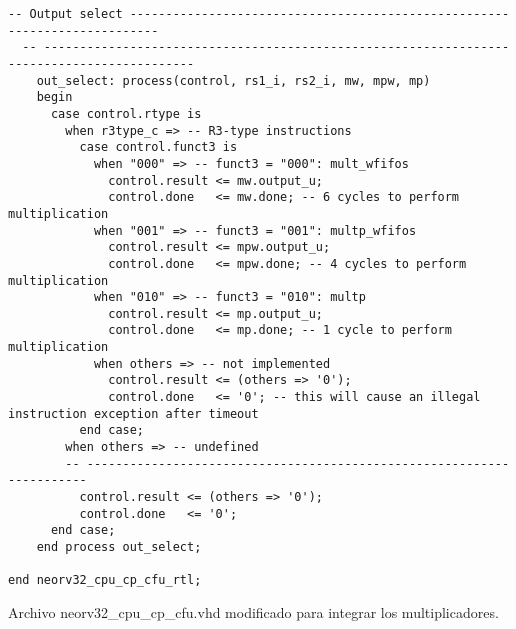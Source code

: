 \begin{code}
\begin{verbatim}
-- Output select --------------------------------------------------------------------------
  -- -------------------------------------------------------------------------------------------
    out_select: process(control, rs1_i, rs2_i, mw, mpw, mp)
    begin
      case control.rtype is
        when r3type_c => -- R3-type instructions
          case control.funct3 is
            when "000" => -- funct3 = "000": mult_wfifos
              control.result <= mw.output_u;
              control.done   <= mw.done; -- 6 cycles to perform multiplication
            when "001" => -- funct3 = "001": multp_wfifos
              control.result <= mpw.output_u;
              control.done   <= mpw.done; -- 4 cycles to perform multiplication
            when "010" => -- funct3 = "010": multp
              control.result <= mp.output_u;
              control.done   <= mp.done; -- 1 cycle to perform multiplication
            when others => -- not implemented
              control.result <= (others => '0');
              control.done   <= '0'; -- this will cause an illegal instruction exception after timeout
          end case;
        when others => -- undefined
        -- ----------------------------------------------------------------------
          control.result <= (others => '0');
          control.done   <= '0';
      end case;
    end process out_select;

end neorv32_cpu_cp_cfu_rtl;
\end{verbatim}
\caption{Archivo neorv32\_cpu\_cp\_cfu.vhd modificado para integrar los multiplicadores.}
\label{ap-cod:16}
\end{code}

